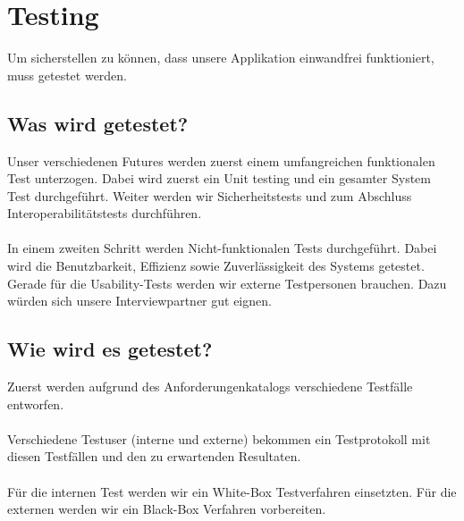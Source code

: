 \chapter{Testing}

Um sicherstellen zu k\"{o}nnen, dass unsere Applikation einwandfrei funktioniert, muss getestet werden.

\section{Was wird getestet?}

Unser verschiedenen Futures werden zuerst einem umfangreichen funktionalen Test unterzogen. Dabei wird zuerst ein Unit testing und ein gesamter System Test durchgef\"{u}hrt. Weiter werden wir Sicherheitstests und zum Abschluss Interoperabilit\"{a}tstests durchf\"{u}hren. \\ \\
In einem zweiten Schritt werden Nicht-funktionalen Tests durchgef\"{u}hrt. Dabei wird die Benutzbarkeit, Effizienz sowie Zuverl\"{a}ssigkeit des Systems getestet. Gerade f\"{u}r die Usability-Tests werden wir externe Testpersonen brauchen. Dazu w\"{u}rden sich unsere Interviewpartner gut eignen.

\section{Wie wird es getestet?}

Zuerst werden aufgrund des Anforderungenkatalogs verschiedene Testf\"{a}lle entworfen. \\ \\
Verschiedene Testuser (interne und externe) bekommen ein Testprotokoll mit diesen Testf\"{a}llen und den zu erwartenden Resultaten. \\ \\ 
F\"{u}r die internen Test werden wir ein White-Box Testverfahren einsetzten. F\"{u}r die externen werden wir ein Black-Box Verfahren vorbereiten.
